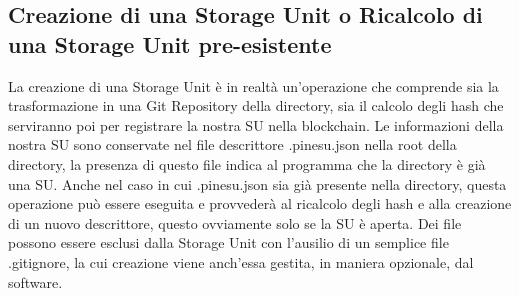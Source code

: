 \subsection{Creazione di una Storage Unit o Ricalcolo di una Storage Unit pre-esistente}
La creazione di una Storage Unit è in realtà un’operazione che comprende sia la trasformazione in una Git Repository della directory, sia il calcolo degli hash che serviranno poi per registrare la nostra SU nella blockchain. Le informazioni della nostra SU sono conservate nel file descrittore \textsf{.pinesu.json} nella root della directory, la presenza di questo file indica al programma che la directory è già una SU. Anche nel caso in cui .pinesu.json sia già presente nella directory, questa operazione può essere eseguita e provvederà al ricalcolo degli hash e alla creazione di un nuovo descrittore, questo ovviamente solo se la SU è aperta.
Dei file possono essere esclusi dalla Storage Unit con l’ausilio di un semplice file \textsf{.gitignore}, la cui creazione viene anch’essa gestita, in maniera opzionale, dal software.

